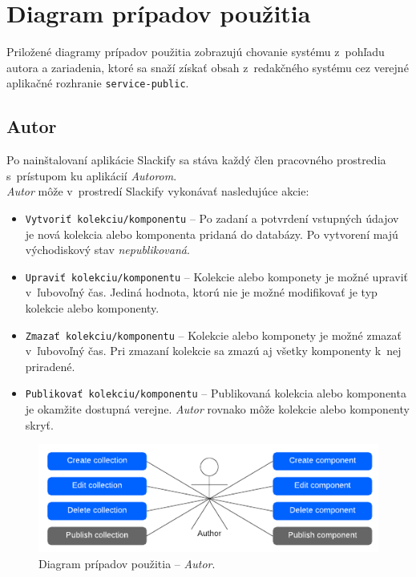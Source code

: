 \section{Diagram prípadov použitia}
Priložené diagramy prípadov použitia zobrazujú chovanie systému z~pohľadu autora a zariadenia, ktoré sa snaží získať obsah z~redakčného systému cez verejné aplikačné rozhranie \texttt{service-public}.

\subsection{Autor}
Po nainštalovaní aplikácie Slackify sa stáva každý člen pracovného prostredia s~prístupom ku aplikácií \emph{Autorom}. \\

\noindent \emph{Autor} môže v~prostredí Slackify vykonávať nasledujúce akcie:

\begin{itemize}
	\item \texttt{Vytvoriť kolekciu/komponentu} -- Po zadaní a potvrdení vstupných údajov je nová kolekcia alebo komponenta pridaná do databázy. Po vytvorení majú východiskový stav \emph{nepublikovaná}.
	\item \texttt{Upraviť kolekciu/komponentu} -- Kolekcie alebo komponety je možné upraviť v~ľubovoľný čas. Jediná hodnota, ktorú nie je možné modifikovať je typ kolekcie alebo komponenty.
	\item \texttt{Zmazať kolekciu/komponentu} -- Kolekcie alebo komponety je možné zmazať v~ľubovoľný čas. Pri zmazaní kolekcie sa zmazú aj všetky komponenty k~nej priradené.
	\item \texttt{Publikovať kolekciu/komponentu} -- Publikovaná kolekcia alebo komponenta je okamžite dostupná verejne. \emph{Autor} rovnako môže kolekcie alebo komponenty skryť.
\end{itemize}

\begin{figure}[h]
	\centering
	\includegraphics[scale=1.4]{obrazky-figures/author_user_case}
	\caption{Diagram prípadov použitia -- \emph{Autor}.}
\end{figure}

